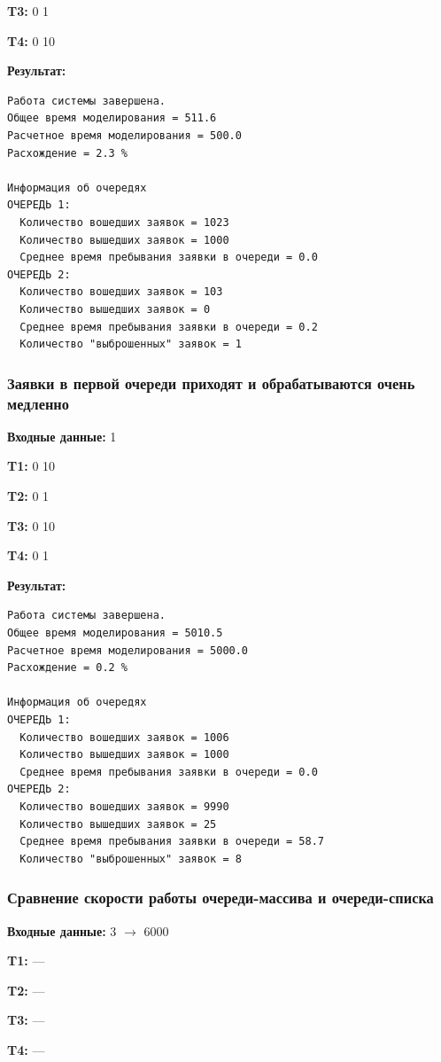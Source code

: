 \documentclass[a4paper,12pt]{extarticle}
\begin{document}
\textbf{T3: }
0 1

\textbf{T4: }
0 10


\textbf{Результат: }
\begin{verbatim}
Работа системы завершена.
Общее время моделирования = 511.6
Расчетное время моделирования = 500.0
Расхождение = 2.3 %

Информация об очередях
ОЧЕРЕДЬ 1:
  Количество вошедших заявок = 1023
  Количество вышедших заявок = 1000
  Среднее время пребывания заявки в очереди = 0.0
ОЧЕРЕДЬ 2:
  Количество вошедших заявок = 103
  Количество вышедших заявок = 0
  Среднее время пребывания заявки в очереди = 0.2
  Количество "выброшенных" заявок = 1
\end{verbatim}

\subsubsection{Заявки в первой очереди приходят и обрабатываются очень медленно}

\textbf{Входные данные: }
1

\textbf{T1: }
0 10

\textbf{T2: }
0 1

\textbf{T3: }
0 10

\textbf{T4: }
0 1


\textbf{Результат: }
\begin{verbatim}
Работа системы завершена.
Общее время моделирования = 5010.5
Расчетное время моделирования = 5000.0
Расхождение = 0.2 %

Информация об очередях
ОЧЕРЕДЬ 1:
  Количество вошедших заявок = 1006
  Количество вышедших заявок = 1000
  Среднее время пребывания заявки в очереди = 0.0
ОЧЕРЕДЬ 2:
  Количество вошедших заявок = 9990
  Количество вышедших заявок = 25
  Среднее время пребывания заявки в очереди = 58.7
  Количество "выброшенных" заявок = 8
\end{verbatim}


\subsubsection{Сравнение скорости работы очереди-массива и очереди-списка}

\textbf{Входные данные: }
3 $\rightarrow$ 6000

\textbf{T1: }
---

\textbf{T2: }
---

\textbf{T3: }
---

\textbf{T4: }
---
\end{document}
